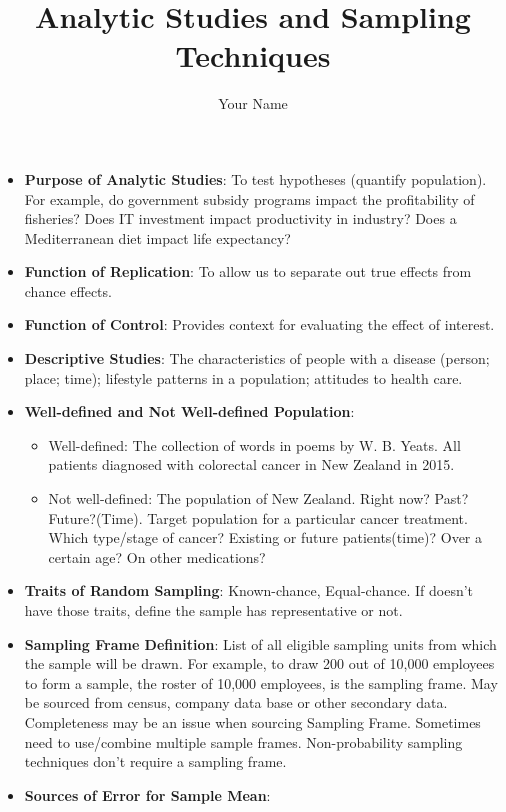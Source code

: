 \documentclass[12pt]{article}
\author{Your Name}
\title{Analytic Studies and Sampling Techniques}
\date{}
\begin{document}
\pagestyle{fancy}

\begin{itemize}
\item \textbf{Purpose of Analytic Studies}: To test hypotheses (quantify population). For example, do government subsidy programs impact the profitability of fisheries? Does IT investment impact productivity in industry? Does a Mediterranean diet impact life expectancy?
\item \textbf{Function of Replication}: To allow us to separate out true effects from chance effects.
\item \textbf{Function of Control}: Provides context for evaluating the effect of interest.
\item \textbf{Descriptive Studies}: The characteristics of people with a disease (person; place; time); lifestyle patterns in a population; attitudes to health care.
\item \textbf{Well-defined and Not Well-defined Population}:
    \begin{itemize}
    \item Well-defined: The collection of words in poems by W. B. Yeats. All patients diagnosed with colorectal cancer in New Zealand in 2015.
    \item Not well-defined: The population of New Zealand. Right now? Past? Future?(Time). Target population for a particular cancer treatment. Which type/stage of cancer? Existing or future patients(time)? Over a certain age? On other medications?
    \end{itemize}
\item \textbf{Traits of Random Sampling}: Known-chance, Equal-chance. If doesn't have those traits, define the sample has representative or not.
\item \textbf{Sampling Frame Definition}: List of all eligible sampling units from which the sample will be drawn. For example, to draw 200 out of 10,000 employees to form a sample, the roster of 10,000 employees, is the sampling frame. May be sourced from census, company data base or other secondary data. Completeness may be an issue when sourcing Sampling Frame. Sometimes need to use/combine multiple sample frames. Non-probability sampling techniques don't require a sampling frame.
\item \textbf{Sources of Error for Sample Mean}:

\end{itemize}
\end{document}
